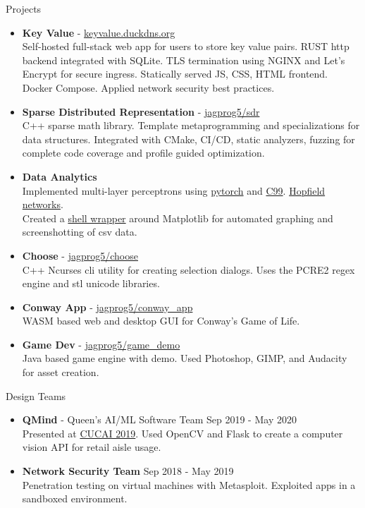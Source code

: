 \documentclass{resume} %
\begin{document}
\begin{rSection}{Projects}
    \begin{itemize}
        \item {\bf Key Value} - \href{https://keyvalue.duckdns.org/}{keyvalue.duckdns.org}\\
        Self-hosted full-stack web app for users to store key value pairs. RUST http backend integrated with SQLite. TLS termination using NGINX and Let's Encrypt for secure ingress.
        Statically served JS, CSS, HTML frontend. Docker Compose. Applied network security best practices.
        \item {\bf Sparse Distributed Representation} - \href{https://github.com/jagprog5/SDR/}{jagprog5/sdr}\\
        C++ sparse math library. Template metaprogramming and specializations for data structures. Integrated with CMake, CI/CD, static analyzers, fuzzing for complete code coverage and profile guided optimization.
        \item {\bf Data Analytics}\\
        Implemented multi-layer perceptrons using \href{https://github.com/jagprog5/mlp}{pytorch} and \href{https://github.com/jagprog5/CNeuralNet}{C99}. \href{https://github.com/jagprog5/hopfield}{Hopfield networks}.\\
        Created a \href{https://github.com/jagprog5/CSV-Plotter}{shell wrapper} around Matplotlib for automated graphing and screenshotting of csv data. 
        \item {\bf Choose} - \href{https://github.com/jagprog5/choose/}{jagprog5/choose}\\
        C++ Ncurses cli utility for creating selection dialogs.
        Uses the PCRE2 regex engine and stl unicode libraries.
        \item {\bf Conway App} - \href{https://github.com/jagprog5/conway_app/}{jagprog5/conway\_app}\\
        WASM based web and desktop GUI for Conway's Game of Life.
        \item {\bf Game Dev} - \href{https://github.com/jagprog5/GameDemo}{jagprog5/game\_demo}\\
        Java based game engine with demo. Used Photoshop, GIMP, and Audacity for asset creation.
    \end{itemize}
\end{rSection}

\begin{rSection}{Design Teams}
    \begin{itemize}
        \item {\bf QMind} - Queen's AI/ML Software Team \hfill {Sep 2019 - May 2020}\\
        Presented at \href{https://medium.com/qmind-ai/cucai2019-c9d5f848f5c}{CUCAI 2019}. Used OpenCV and Flask to create a computer vision API for retail aisle usage.
        \item {\bf Network Security Team} \hfill {Sep 2018 - May 2019}\\
        Penetration testing on virtual machines with Metasploit. Exploited apps in a sandboxed environment.
\end{itemize}
\end{rSection}
\end{document}
